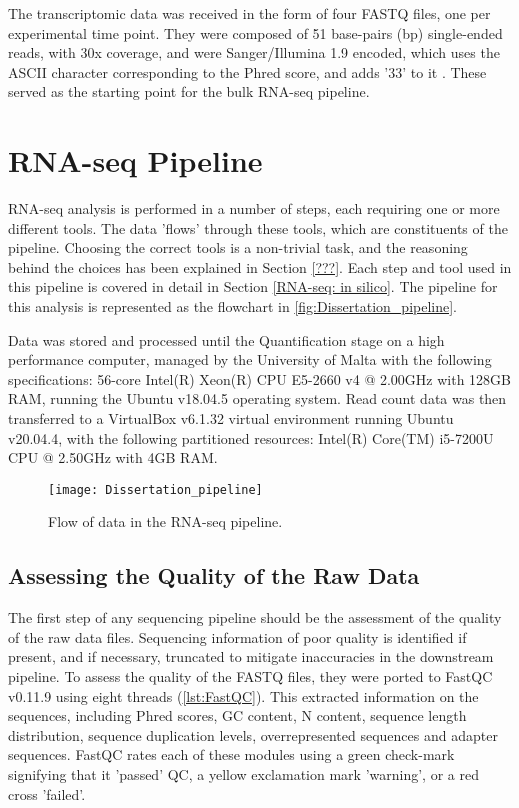 The transcriptomic data was received in the form of four FASTQ \citep{cock2010sanger} files, one per experimental time point. They were composed of 51 base-pairs (bp) single-ended reads, with 30x coverage, and were Sanger/Illumina 1.9 encoded, which uses the ASCII character corresponding to the Phred score, and adds '33' to it \citep{ewing1998base}. These served as the starting point for the bulk RNA-seq pipeline.

\section{RNA-seq Pipeline}
RNA-seq analysis is performed in a number of steps, each requiring one or more different tools. The data 'flows' through these tools, which are constituents of the pipeline. Choosing the correct tools is a non-trivial task, and the reasoning behind the choices has been explained in Section \ref{???}. Each step and tool used in this pipeline is covered in detail in Section \ref{RNA-seq: in silico}. The pipeline for this analysis is represented as the flowchart in \autoref{fig:Dissertation_pipeline}.

Data was stored and processed until the Quantification stage on a high performance computer, managed by the University of Malta with the following specifications: 56-core Intel(R) Xeon(R) CPU E5-2660 v4 @ 2.00GHz with 128GB RAM, running the Ubuntu v18.04.5 operating system. Read count data was then transferred to a VirtualBox v6.1.32 \citep{virtualbox} virtual environment running Ubuntu v20.04.4, with the following partitioned resources: Intel(R) Core(TM) i5-7200U CPU @ 2.50GHz with 4GB RAM.
\begin{figure}[!h]
    \centering
    \texttt{[image: Dissertation\_pipeline]}
    \caption[Flow of data in the RNA-seq pipeline]{Flow of data in the RNA-seq pipeline.} 
    \label{fig:Dissertation_pipeline}
\end{figure}
\clearpage

\subsection{Assessing the Quality of the Raw Data}

The first step of any sequencing pipeline should be the assessment of the quality of the raw data files. Sequencing information of poor quality is identified if present, and if necessary, truncated to mitigate inaccuracies in the downstream pipeline. To assess the quality of the FASTQ files, they were ported to FastQC v0.11.9 \citep{andrews2010fastqc} using eight threads (\autoref{lst:FastQC}). This extracted information on the sequences, including Phred scores, GC content, N content, sequence length distribution, sequence duplication levels, overrepresented sequences and adapter sequences. FastQC rates each of these modules using a green check-mark signifying that it 'passed' QC, a yellow exclamation mark 'warning', or a red cross 'failed'. 

